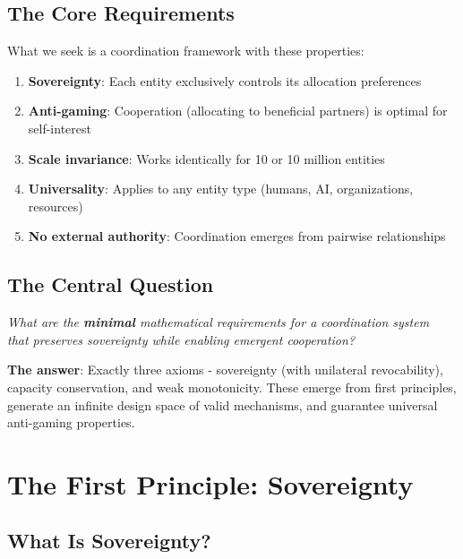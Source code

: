 \documentclass[11pt,a4paper]{article}
\theoremstyle{definition}
\theoremstyle{remark}
\begin{document}
\subsection{The Core Requirements}

What we seek is a coordination framework with these properties:

\begin{enumerate}
\item \textbf{Sovereignty}: Each entity exclusively controls its allocation preferences
\item \textbf{Anti-gaming}: Cooperation (allocating to beneficial partners) is optimal for self-interest
\item \textbf{Scale invariance}: Works identically for 10 or 10 million entities
\item \textbf{Universality}: Applies to any entity type (humans, AI, organizations, resources)
\item \textbf{No external authority}: Coordination emerges from pairwise relationships
\end{enumerate}

\subsection{The Central Question}

\begin{center}
\large
\textit{What are the \textbf{minimal} mathematical requirements for a coordination system}\\
\textit{that preserves sovereignty while enabling emergent cooperation?}
\end{center}

\medskip

\textbf{The answer}: Exactly three axioms - sovereignty (with unilateral revocability), capacity conservation, and weak monotonicity. These emerge from first principles, generate an infinite design space of valid mechanisms, and guarantee universal anti-gaming properties.



\section{The First Principle: Sovereignty}

\subsection{What Is Sovereignty?}
\end{document}
